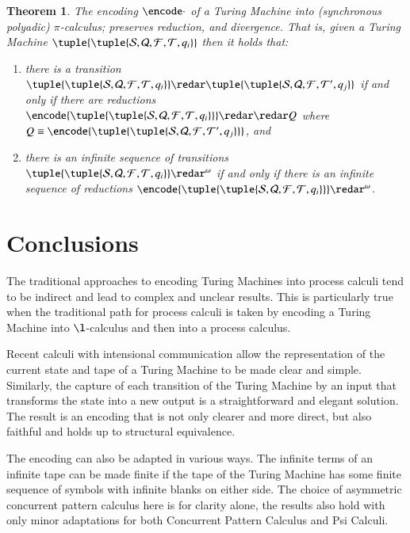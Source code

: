 \documentclass[submission,copyright,creativecommons]{eptcs}
\newtheorem{theorem}{Theorem}[section]
\newcommand{\tmach}[1]{\tuple{\tuple{#1}}}
\begin{document}
\begin{theorem}
\label{thm:done-pi}
The encoding $\encode\cdot$ of a Turing Machine into (synchronous polyadic) $\pi$-calculus;
preserves reduction, and divergence.
That is, given a Turing Machine $\tmach{{\mathcal S}, {\mathcal Q}, {\mathcal F}, {\mathcal T}, q_i}$
then it holds that:
\begin{enumerate}
\item there is a transition
$\tmach{{\mathcal S}, {\mathcal Q}, {\mathcal F}, {\mathcal T}, q_i}\redar
\tmach{{\mathcal S}, {\mathcal Q}, {\mathcal F}, {\mathcal T}', q_j}$
if and only if there are reductions
$\encode{\tmach{{\mathcal S}, {\mathcal Q}, {\mathcal F}, {\mathcal T}, q_i}}\redar\redar Q$
where $Q\equiv\encode{\tmach{{\mathcal S}, {\mathcal Q}, {\mathcal F}, {\mathcal T}', q_j}}$, and
\item there is an infinite sequence of transitions
$\tmach{{\mathcal S}, {\mathcal Q}, {\mathcal F}, {\mathcal T}, q_i}\redar^\omega$
if and only if there is an infinite sequence of reductions
$\encode{\tmach{{\mathcal S}, {\mathcal Q}, {\mathcal F}, {\mathcal T}, q_i}}\redar^\omega$.
\end{enumerate}
\end{theorem}




\section{Conclusions}
\label{sec:conc}

The traditional approaches to encoding Turing Machines into process calculi
tend to be indirect and lead to complex and unclear results.
This is particularly true when the traditional path for process calculi is
taken by encoding a Turing Machine into $\l$-calculus and then into a 
process calculus.

Recent calculi with intensional communication allow the representation of
the current state and tape of a Turing Machine to be made clear and simple.
Similarly, the capture of each transition of the Turing Machine by an
input that transforms the state into a new output is a straightforward and
elegant solution.
The result is an encoding that is not only clearer and more direct, but also
faithful and holds up to structural equivalence.

The encoding can also be adapted in various ways.
The infinite terms of an infinite tape can be made finite if the tape of
the Turing Machine has some finite sequence of symbols with infinite blanks
on either side.
The choice of asymmetric concurrent pattern calculus here is for clarity alone,
the results also hold with only minor adaptations for both Concurrent Pattern
Calculus and Psi Calculi.
\end{document}
